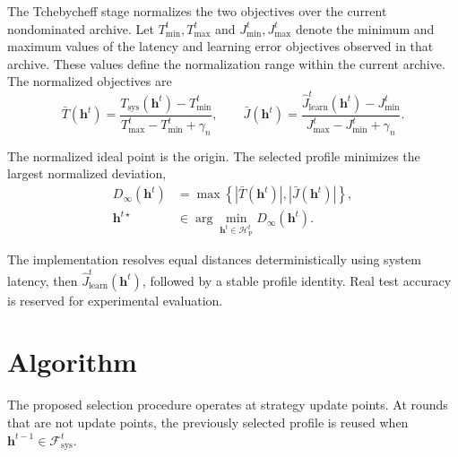 \documentclass[5p,times]{elsarticle}
\theoremstyle{plain}
\theoremstyle{definition}
\theoremstyle{remark}
\begin{document}
The Tchebycheff stage normalizes the two objectives over the current nondominated archive. Let $T_{\min}^t,T_{\max}^t$ and $J_{\min}^t,J_{\max}^t$ denote the minimum and maximum values of the latency and learning error objectives observed in that archive. These values define the normalization range within the current archive. The normalized objectives are
\begin{equation}
\bar T(\mathbf h^t)
=
\frac{
T_{\mathrm{sys}}(\mathbf h^t)-T_{\min}^t
}{
T_{\max}^t-T_{\min}^t+\gamma_n
},
\qquad
\bar J(\mathbf h^t)
=
\frac{
\widehat J_{\mathrm{learn}}^t(\mathbf h^t)-J_{\min}^t
}{
J_{\max}^t-J_{\min}^t+\gamma_n
}.
\label{eq:pareto_normalization}
\end{equation}

The normalized ideal point is the origin. The selected profile minimizes the largest normalized deviation,
\begin{equation}
\begin{aligned}
D_\infty(\mathbf h^t)
&=
\max\left\{
\left|\bar T(\mathbf h^t)\right|,
\left|\bar J(\mathbf h^t)\right|
\right\},
\\
\mathbf h^{t\star}
&\in
\arg\min_{\mathbf h^t\in\mathcal H_{\mathrm P}^t}
D_\infty(\mathbf h^t).
\end{aligned}
\label{eq:selection}
\end{equation}

The implementation resolves equal distances deterministically using system latency, then \(\widehat J_{\mathrm{learn}}^t(\mathbf h^t)\), followed by a stable profile identity. Real test accuracy is reserved for experimental evaluation.
\section{Algorithm}
\label{sec:algorithm}

The proposed selection procedure operates at strategy update points. At
rounds that are not update points, the previously selected profile is reused
when \(\mathbf h^{t-1}\in\mathcal F_{\mathrm{sys}}^t\).
\end{document}
